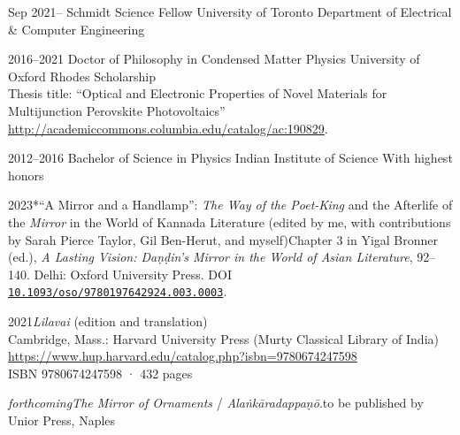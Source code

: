\documentclass{scrartcl}
\begin{document}
\begin{entrylist}
\entry
{Sep 2021–}
{Schmidt Science Fellow}
{University of Toronto}
{Department of Electrical \& Computer Engineering}
\end{entrylist}


\begin{entrylist}
\entry
{2016--2021}
{Doctor of Philosophy in Condensed Matter Physics}
{University of Oxford}
{Rhodes Scholarship\\
Thesis title: ``Optical and Electronic Properties of Novel Materials for Multijunction Perovskite Photovoltaics''\\
\url{http://academiccommons.columbia.edu/catalog/ac:190829}.}

\entry
{2012--2016}
{Bachelor of Science in Physics}
{Indian Institute of Science}
{With highest honors}

\end{entrylist}\bigskip\bigskip




\begin{entrylist}
{2023}{*“A Mirror and a Handlamp”: \emph{The Way of the Poet-King} and the Afterlife of the \emph{Mirror} in the World of Kannada Literature (edited by me, with contributions by Sarah Pierce Taylor, Gil Ben-Herut, and myself)}{Chapter 3 in Yigal Bronner (ed.), \emph{A Lasting Vision: Daṇḍin’s Mirror in the World of Asian Literature}, 92–140. Delhi: Oxford University Press. DOI \href{https://doi.org/10.1093/oso/9780197642924.003.0003}{\texttt{10.1093/oso/9780197642924.003.0003}}.}
\end{entrylist}\bigskip

\begin{entrylist}
\singleentry
{2021}{\emph{Lilavai} (edition and translation)\\
Cambridge, Mass.: Harvard University Press (Murty Classical Library of India)\\
\url{https://www.hup.harvard.edu/catalog.php?isbn=9780674247598}\\
ISBN 9780674247598 · 432 pages}
\end{entrylist}

\begin{entrylist}
{\emph{forthcoming}}{\emph{The Mirror of Ornaments} / \emph{Alaṅkāradappaṇō}.}{to be published by Unior Press, Naples}
\end{entrylist}
\end{document}
